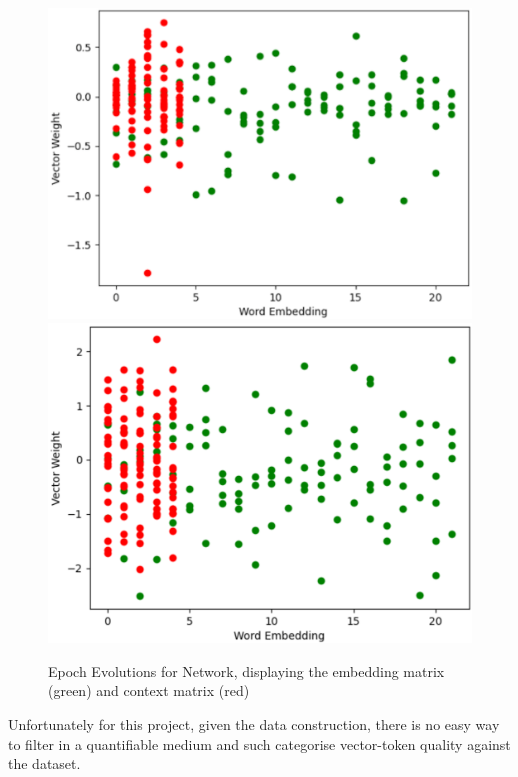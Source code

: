 \begin{figure}[H]
    \includegraphics[width=0.49\columnwidth]{figures/chapter-6/epoch1.png}
    \includegraphics[width=0.49\columnwidth]{figures/chapter-6/epoch58.png}
    \caption[Epoch Evolutions for Network]{Epoch Evolutions for Network, displaying the embedding matrix (green) and context matrix (red)
    \label{fig:EpochEvolutions}}
\end{figure}

Unfortunately for this project, given the data construction, there is no easy way to filter in a quantifiable medium and such categorise vector-token quality against the dataset.